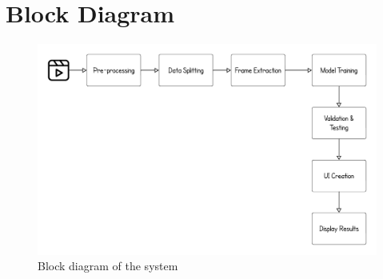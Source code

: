 \pagebreak

\section{Block Diagram}	
	
\begin{figure}[h]
    \centering
    \includegraphics[width=1\linewidth]{img/Block_diagram.png}
    \caption{Block diagram of the system}
    \label{fig:Block Diagram of the system}
\end{figure}
	

